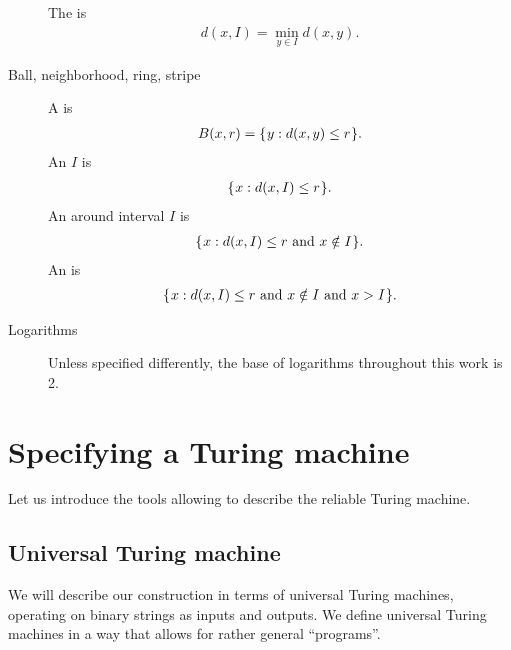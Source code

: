 \documentclass[12pt]{memoir}
\renewcommand{\le}{\leq}
\begin{document}
\begin{description}
The   is
\begin{align*}
    d(x,I)= \min_{y\in I}d(x,y).
\end{align*}

\item [Ball, neighborhood, ring, stripe]
A  is
\begin{align*}
    B(x,r)= \setOf{y}{d(x,y)\le r}.
\end{align*}
An  \( I \) is
\begin{align*}
    \setOf{x}{d(x,I)\le r}.
\end{align*}
An  around interval \( I \) is
\begin{align*}
    \setOf{x}{d(x,I)\le r \txt{ and } x \notin I}.
\end{align*}
An  is
\begin{align*}
    \setOf{x}{d(x,I)\le r \txt{ and } x \notin I \txt{ and } x>I}.
\end{align*}

\item[Logarithms] Unless specified differently,
the base of logarithms throughout this work is 2.

\end{description}


\section{Specifying a Turing machine}\label{sec:specifying}

Let us introduce the tools allowing to describe the reliable Turing machine.

\subsection{Universal Turing machine}\label{sec:UTM}

We will describe our construction in terms of
universal Turing machines,
operating on binary strings as inputs and outputs.
We define universal Turing machines in a way that allows
for rather general ``programs''.
\end{document}
